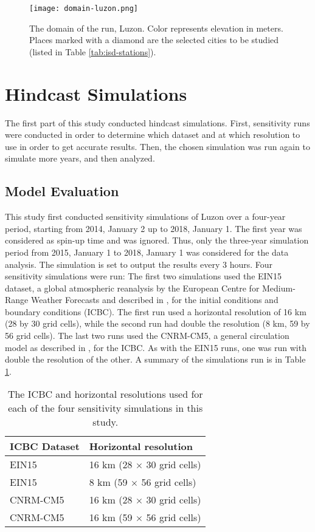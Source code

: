 		\begin{figure}
			\centering
			\texttt{[image: domain-luzon.png]}
			\caption{
				The domain of the run, Luzon.
				Color represents elevation in meters.
				Places marked with a diamond are the selected cities to be studied (listed in Table \ref{tab:isd-stations}).
			}
			\label{fig:domain-luzon}
		\end{figure}	
		
	
\section{Hindcast Simulations}
	The first part of this study conducted hindcast simulations.
	First, sensitivity runs were conducted in order to determine which dataset and at which resolution to use in order to get accurate results.
	Then, the chosen simulation was run again to simulate more years, and then analyzed.
	
	\subsection{Model Evaluation}
		This study first conducted sensitivity simulations of Luzon over a four-year period, starting from 2014, January 2 up to 2018, January 1.
		The first year was considered as spin-up time and was ignored.
		Thus, only the three-year simulation period from 2015, January 1 to 2018, January 1 was considered for the data analysis.
		The simulation is set to output the results every 3 hours.
		Four sensitivity simulations were run:
		The first two simulations used the EIN15 dataset, a global
		atmospheric reanalysis by the European Centre for
		Medium-Range Weather Forecasts and described in \textcite{Dee2011}, for the initial conditions and boundary
		conditions (ICBC).
		The first run used a horizontal resolution of 16 km (28 by 30 grid cells), while the second run had double the resolution (8 km, 59 by 56 grid cells).
		The last two runs used the CNRM-CM5, a general circulation model as described in \textcite{Voldoire2012}, for the ICBC.
		As with the EIN15 runs, one was run with double the resolution of the other.
		A summary of the simulations run is in Table \ref{tab:summary-sensitivity-runs}.
		\begin{table}[]
			\caption{The ICBC and horizontal resolutions used for each of the four sensitivity simulations in this study.}
			\label{tab:summary-sensitivity-runs}
			\centering
			\begin{tabular}{ll}
				\hline \hline 
				ICBC Dataset & Horizontal resolution \\
				\hline
				EIN15 & 16 km (28 $\times$ 30 grid cells) \\
				EIN15 & 8 km (59 $\times$ 56 grid cells) \\
				CNRM-CM5 & 16 km (28 $\times$ 30 grid cells) \\
				CNRM-CM5 & 16 km (59 $\times$ 56 grid cells) \\
				\hline
			\end{tabular}
		\end{table}
		
